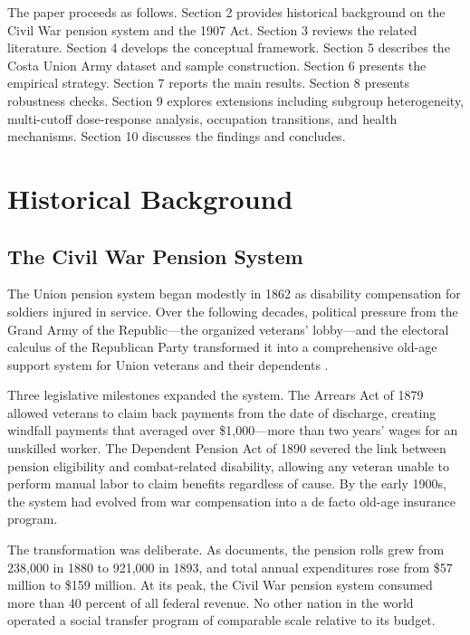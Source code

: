 \documentclass[12pt]{article}
\begin{document}
The paper proceeds as follows. Section 2 provides historical background on the Civil War pension system and the 1907 Act. Section 3 reviews the related literature. Section 4 develops the conceptual framework. Section 5 describes the Costa Union Army dataset and sample construction. Section 6 presents the empirical strategy. Section 7 reports the main results. Section 8 presents robustness checks. Section 9 explores extensions including subgroup heterogeneity, multi-cutoff dose-response analysis, occupation transitions, and health mechanisms. Section 10 discusses the findings and concludes.


\section{Historical Background}

\subsection{The Civil War Pension System}

The Union pension system began modestly in 1862 as disability compensation for soldiers injured in service. Over the following decades, political pressure from the Grand Army of the Republic---the organized veterans' lobby---and the electoral calculus of the Republican Party transformed it into a comprehensive old-age support system for Union veterans and their dependents \citep{skocpol1992protecting, skocpol1993americas}.

Three legislative milestones expanded the system. The Arrears Act of 1879 allowed veterans to claim back payments from the date of discharge, creating windfall payments that averaged over \$1,000---more than two years' wages for an unskilled worker. The Dependent Pension Act of 1890 severed the link between pension eligibility and combat-related disability, allowing any veteran unable to perform manual labor to claim benefits regardless of cause. By the early 1900s, the system had evolved from war compensation into a de facto old-age insurance program.

The transformation was deliberate. As \citet{glasson1918federal} documents, the pension rolls grew from 238,000 in 1880 to 921,000 in 1893, and total annual expenditures rose from \$57 million to \$159 million. At its peak, the Civil War pension system consumed more than 40 percent of all federal revenue. No other nation in the world operated a social transfer program of comparable scale relative to its budget.
\end{document}
